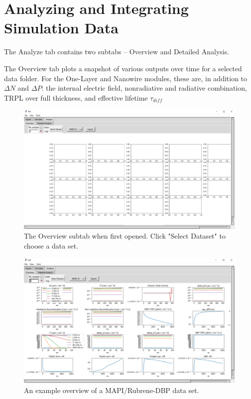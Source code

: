 \documentclass[11pt,letterpaper,titlepage]{article}
\begin{document}
	\newpage
	\section{Analyzing and Integrating Simulation Data}
		\par The Analyze tab contains two subtabs – Overview and Detailed Analysis.
		
		\par The Overview tab plots a snapshot of various outputs over time for a selected data folder. For the One-Layer and Nanowire modules, these are, in addition to $\Delta N$ and $\Delta P$: the internal electric field, nonradiative and radiative combination, TRPL over full thickness, and effective lifetime $\tau_{diff}$
		
		\begin{figure}[H]
			\label{fig:overview_blank}
			\centering
			\includegraphics[scale=0.36]{"overview_blank"}
			\caption{The Overview subtab when first opened. Click "Select Dataset" to choose a data set.}
		\end{figure}
	
		\begin{figure}[H]
			\label{fig:overview_example}
			\centering
			\includegraphics[scale=0.36]{"overview_example"}
			\caption{An example overview of a MAPI/Rubrene-DBP data set.}
		\end{figure}
	
\end{document}
